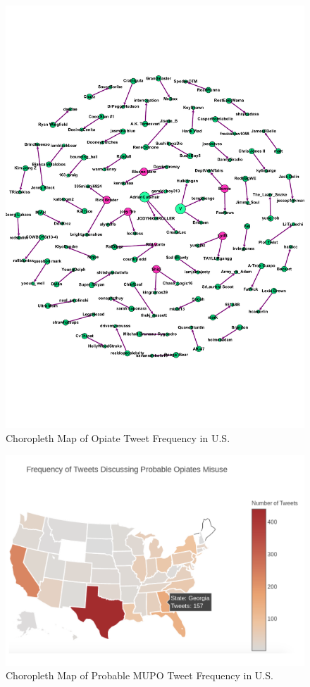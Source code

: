 \documentclass[sigconf]{acmart}
\begin{document}
\begin{figure}[!ht]
  \centering\includegraphics[width=\columnwidth]{images/Figure3.pdf}
  \caption{Choropleth Map of Opiate Tweet Frequency in U.S.}
  \label{f:Figure3}
\end{figure}

\begin{figure}[!ht]
  \centering\includegraphics[width=\columnwidth]{images/Figure4.pdf}
  \caption{Choropleth Map of Probable MUPO Tweet Frequency in U.S.}
  \label{f:Figure4}
\end{figure}
\end{document}

